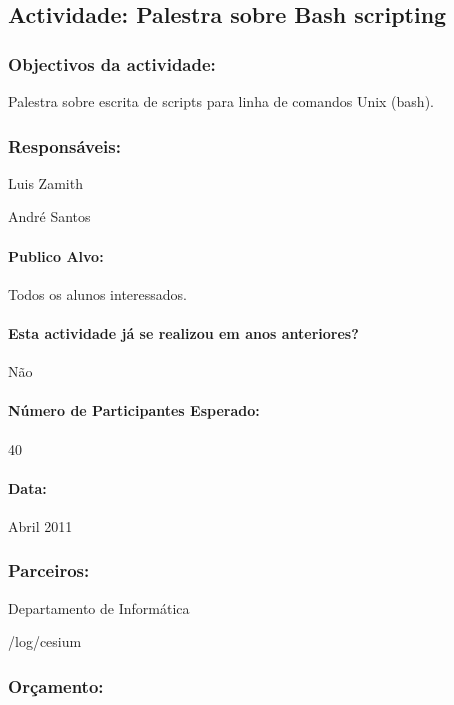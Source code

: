 \subsection{Actividade: Palestra sobre Bash scripting} %

\subsubsection*{Objectivos da actividade:}
Palestra sobre escrita de scripts para linha de comandos Unix (bash).

\subsubsection*{Responsáveis:}
\begin{itemizedash}
	\item{Luis Zamith}
	\item{André Santos}
\end{itemizedash}

\paragraph{Publico Alvo: }
Todos os alunos interessados.

\paragraph{Esta actividade já se realizou em anos anteriores?}
Não

\paragraph{Número de Participantes Esperado:}
40

\paragraph{Data:} Abril 2011

\subsubsection*{Parceiros:}
\begin{itemizedash}
    \item{Departamento de Informática}
	\item{/log/cesium}
\end{itemizedash}

\subsubsection*{Orçamento:}

